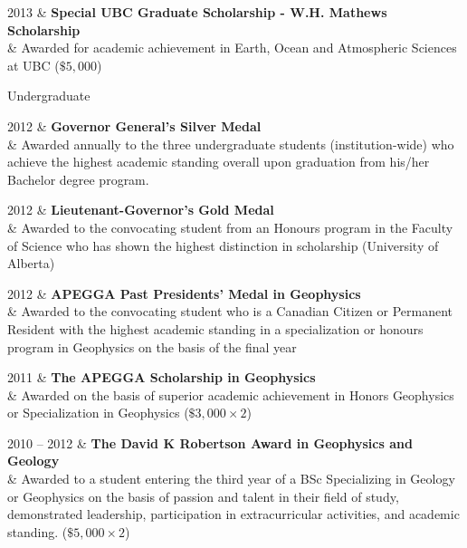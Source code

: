 \documentclass[a4paper, 11pt]{article}
\newcommand{\subheading}[1]{
    \vspace{0.4cm}
    {\Large #1}\\
    \vspace{-0.2cm}
}
\begin{document}
\begin{entryright}
2013 & \textbf{Special UBC Graduate Scholarship - W.H. Mathews Scholarship} \\
& Awarded for academic achievement in Earth, Ocean and Atmospheric Sciences at UBC ($\$5,000$)
\end{entryright}

\subheading{Undergraduate}
\begin{entryright}
2012 & \textbf{Governor General's Silver Medal} \\
& Awarded annually to the three undergraduate students (institution-wide) who achieve the highest academic standing overall upon graduation from his/her Bachelor degree program.
\end{entryright}

\begin{entryright}
2012 & \textbf{Lieutenant-Governor's Gold Medal} \\
& Awarded to the convocating student from an Honours program in the Faculty of Science who has shown the highest distinction in scholarship (University of Alberta)
\end{entryright}

\begin{entryright}
2012 & \textbf{APEGGA Past Presidents' Medal in Geophysics} \\
& Awarded to the convocating student who is a Canadian Citizen or Permanent Resident with the highest academic standing in a specialization or honours program in Geophysics on the basis of the final year
\end{entryright}

\begin{entryright}
2011 & \textbf{The APEGGA Scholarship in Geophysics} \\
& Awarded on the basis of superior academic achievement in Honors Geophysics or Specialization in Geophysics ($\$3,000 \times 2$)
\end{entryright}

\begin{entryright}
2010 -- 2012 & \textbf{The David K Robertson Award in Geophysics and Geology} \\
& Awarded to a student entering the third year of a BSc Specializing in Geology or Geophysics on the basis of passion and talent in their field of study, demonstrated leadership, participation in extracurricular activities, and academic standing. ($\$5,000 \times 2$)
\end{entryright}
\end{document}
